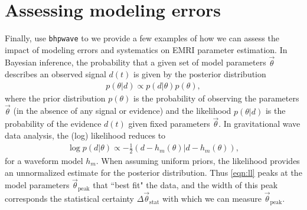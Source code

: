 \documentclass[%
 reprint,
 nofootinbib,
 amsmath,amssymb,
 aps,
 prd,
]{revtex4-2}
\begin{document}




\section{Assessing modeling errors}
\label{sec:errors}

Finally, use \texttt{bhpwave} to we provide a few examples of how we can assess the impact of modeling errors and systematics on EMRI parameter estimation. In Bayesian inference, the probability that a given set of model parameters $\vec{\theta}$ describes an observed signal $d(t)$ is given by the posterior distribution
\begin{align}
    p(\theta | d) \propto p(d|\theta) p(\theta),
\end{align}
where the prior distribution $p(\theta)$ is the probability of observing the parameters $\vec{\theta}$ (in the absence of any signal or evidence) and the likelihood $p(\theta |d)$ is the probability of the evidence $d(t)$ given fixed parameters $\vec{\theta}$. In gravitational wave data analysis, the (log) likelihood reduces to \cite{Whit53}
\begin{align} \label{eqn:ll}
    \log p(d|\theta) \propto -\frac{1}{2}(d - h_m(\theta)| d- h_m(\theta)),
\end{align}
for a waveform model $h_m$. When assuming uniform priors, the likelihood provides an unnormalized estimate for the posterior distribution. Thus \eqref{eqn:ll} peaks at the model parameters $\vec{\theta}_\mathrm{peak}$ that ``best fit" the data, and the width of this peak corresponds the statistical certainty $\Delta \vec{\theta}_\mathrm{stat}$ with which we can measure $\vec{\theta}_\mathrm{peak}$. 
\end{document}
